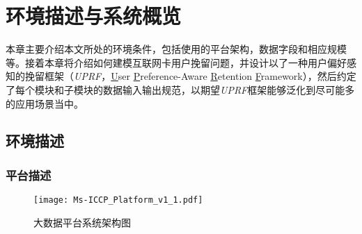 \newpage


\section{环境描述与系统概览}
本章主要介绍本文所处的环境条件，包括使用的平台架构，数据字段和相应规模等。接着本章将介绍如何建模互联网卡用户挽留问题，并设计以了一种用户偏好感知的挽留框架（\emph{UPRF}，\underline{U}ser \underline{P}reference-Aware \underline{R}etention \underline{F}ramework），然后约定了每个模块和子模块的数据输入输出规范，以期望\emph{UPRF}框架能够泛化到尽可能多的应用场景当中。

\subsection{环境描述}
\subsubsection{平台描述}
\begin{figure}[hbt]
	\centering
	\texttt{[image: Ms-ICCP\_Platform\_v1\_1.pdf]}
	\caption{大数据平台系统架构图}
	\label{Fig:Data-Platform}
\end{figure}

